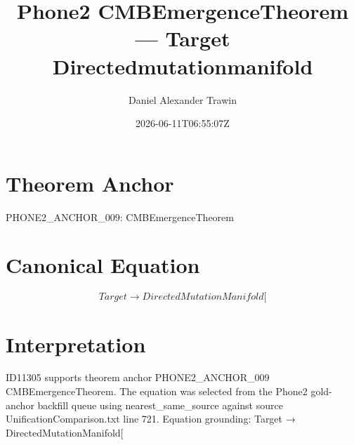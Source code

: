 \documentclass[11pt]{article}
\title{Phone2 CMBEmergenceTheorem — Target Directedmutationmanifold}
\author{Daniel Alexander Trawin}
\date{2026-06-11T06:55:07Z}
\begin{document}
\maketitle
\section*{Theorem Anchor}
PHONE2_ANCHOR_009: CMBEmergenceTheorem
\section*{Canonical Equation}
\[
Target → DirectedMutationManifold[
\]
\section*{Interpretation}
ID11305 supports theorem anchor PHONE2_ANCHOR_009 CMBEmergenceTheorem. The equation was selected from the Phone2 gold-anchor backfill queue using nearest_same_source against source UnificationComparison.txt line 721. Equation grounding: Target → DirectedMutationManifold[
\end{document}
